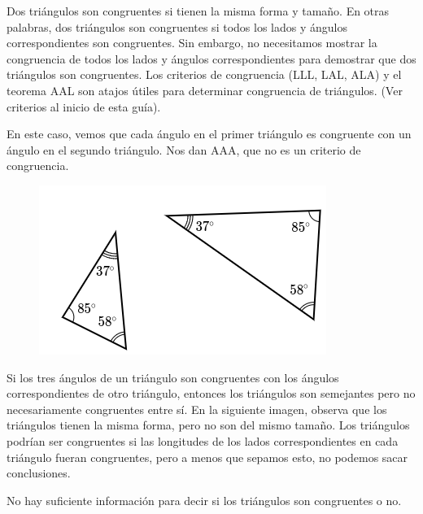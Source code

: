 \begin{solutionbox}{10cm}
    \begin{minipage}{0.6\textwidth}
        Dos triángulos son congruentes si tienen la misma forma y tamaño. En otras palabras, dos triángulos son congruentes si todos los lados y ángulos correspondientes son congruentes.
        Sin embargo, no necesitamos mostrar la congruencia de todos los lados y ángulos correspondientes para demostrar que dos triángulos son congruentes. Los criterios de congruencia (LLL, LAL, ALA) y el teorema AAL son atajos útiles para determinar congruencia de triángulos. (Ver criterios al inicio de esta guía).

        En este caso, vemos que cada ángulo en el primer triángulo es congruente con un ángulo en el segundo triángulo. Nos dan AAA, que no es un criterio de congruencia.

    \end{minipage}\hfill
    \begin{minipage}{0.35\textwidth}
        \begin{figure}[H]
            \centering
            \includegraphics[width=0.8\linewidth]{../images/20230323153219}
            \caption{}
            \label{fig:20230323153219}
        \end{figure}
    \end{minipage}

    Si los tres ángulos de un triángulo son congruentes con los ángulos correspondientes de otro triángulo, entonces los triángulos son semejantes pero no necesariamente congruentes entre sí. En la siguiente imagen, observa que los triángulos tienen la misma forma, pero no son del mismo tamaño.
    Los triángulos podrían ser congruentes si las longitudes de los lados correspondientes en cada triángulo fueran congruentes, pero a menos que sepamos esto, no podemos sacar conclusiones.

    No hay suficiente información para decir si los triángulos son congruentes o no.
\end{solutionbox}